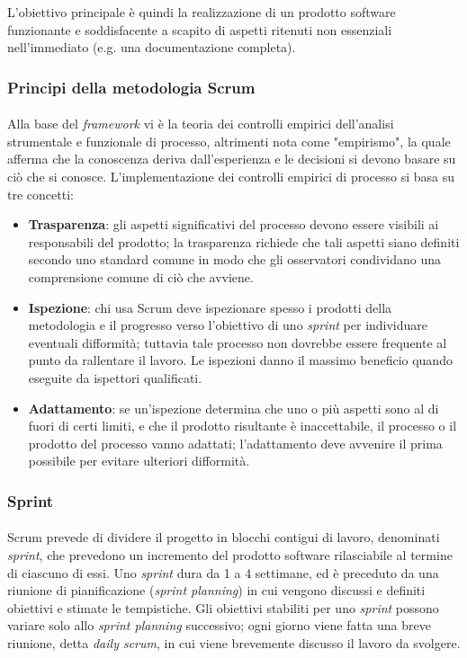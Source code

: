 L'obiettivo principale è quindi la realizzazione di un prodotto software funzionante e soddisfacente a scapito di aspetti ritenuti non essenziali nell'immediato (e.g. una documentazione completa).

\subsubsection{Principi della metodologia Scrum}
\paragraph{}
Alla base del \textit{framework} vi è la teoria dei controlli empirici dell'analisi strumentale e funzionale di processo, altrimenti nota come "empirismo", la quale afferma che la conoscenza deriva dall'esperienza e le decisioni si devono basare su ciò che si conosce. L'implementazione dei controlli empirici di processo si basa su tre concetti:
\begin{itemize}
    \item \textbf{Trasparenza}: gli aspetti significativi del processo devono essere visibili ai responsabili del prodotto; la trasparenza richiede che tali aspetti siano definiti secondo uno standard comune in modo che gli osservatori condividano una comprensione comune di ciò che avviene.
    \item \textbf{Ispezione}: chi usa Scrum deve ispezionare spesso i prodotti della metodologia e il progresso verso l'obiettivo di uno \textit{sprint} per individuare eventuali difformità; tuttavia tale processo non dovrebbe essere frequente al punto da rallentare il lavoro. Le ispezioni danno il massimo beneficio quando eseguite da ispettori qualificati.
    \item \textbf{Adattamento}: se un'ispezione determina che uno o più aspetti sono al di fuori di certi limiti, e che il prodotto risultante è inaccettabile, il processo o il prodotto del processo vanno adattati; l'adattamento deve avvenire il prima possibile per evitare ulteriori difformità.
\end{itemize}

\subsubsection{Sprint}
\paragraph{}
Scrum prevede di dividere il progetto in blocchi contigui di lavoro, denominati \textit{sprint}, che prevedono un incremento del prodotto software rilasciabile al termine di ciascuno di essi.
Uno \textit{sprint} dura da 1 a 4 settimane, ed è preceduto da una riunione di pianificazione (\textit{sprint planning}) in cui vengono discussi e definiti obiettivi e stimate le tempistiche. Gli obiettivi stabiliti per uno \textit{sprint} possono variare solo allo \textit{sprint planning} successivo; ogni giorno viene fatta una breve riunione, detta \textit{daily scrum}, in cui viene brevemente discusso il lavoro da svolgere.

